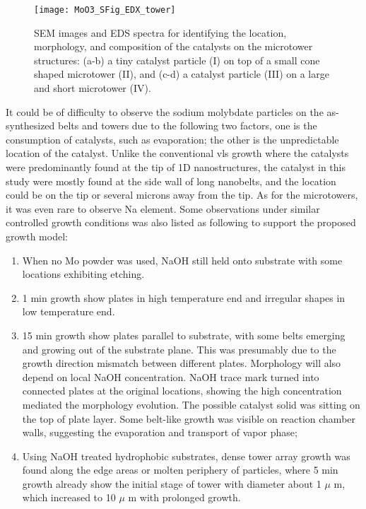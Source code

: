 \begin{figure}[htb]
\centering
\texttt{[image: MoO3\_SFig\_EDX\_tower]}
\caption[SEM images and EDS spectra for identifying the location, morphology, and composition of the catalysts on the microtower structures]{SEM images and EDS spectra for identifying the location, morphology, and composition of the catalysts on the microtower structures: (a-b) a tiny catalyst particle (I) on top of a small cone shaped microtower (II), and (c-d) a catalyst particle (III) on a large and short microtower (IV).}
\label{fig:ch4edx2}
\end{figure}
It could be of difficulty to observe the sodium molybdate particles on the as-synthesized belts and towers due to the following two factors, one is the consumption of catalysts, such as evaporation; the other is the unpredictable location of the catalyst. Unlike the conventional \gls{vls} growth where the catalysts were predominantly found at the tip of 1D nanostructures, the catalyst in this study were mostly found at the side wall of long nanobelts, and the location could be on the tip or several microns away from the tip. As for the microtowers, it was even rare to observe Na element. Some observations under similar controlled growth conditions was also listed as following to support the proposed growth model: 
\begin{enumerate}
\item When no Mo powder was used, NaOH still held onto substrate with some locations exhibiting etching.
\item 1 min growth show plates in high temperature end and irregular shapes in low temperature end.
\item 15 min growth show  plates parallel to substrate, with some belts emerging and growing out of the substrate plane. This was presumably due to the growth direction mismatch between different plates. Morphology will also depend on local NaOH concentration. NaOH trace mark turned into connected plates at the original locations, showing the high concentration mediated the morphology evolution. The possible catalyst solid was sitting on the top of plate layer. Some belt-like growth was visible on reaction chamber walls, suggesting the evaporation and transport of  vapor phase;
\item Using NaOH treated hydrophobic substrates, dense tower array growth was found along the edge areas or molten periphery of particles, where 5 min growth already show the initial stage of tower with diameter about 1 $\mu$ m, which increased to 10 $\mu$ m with prolonged growth.
\end{enumerate}

